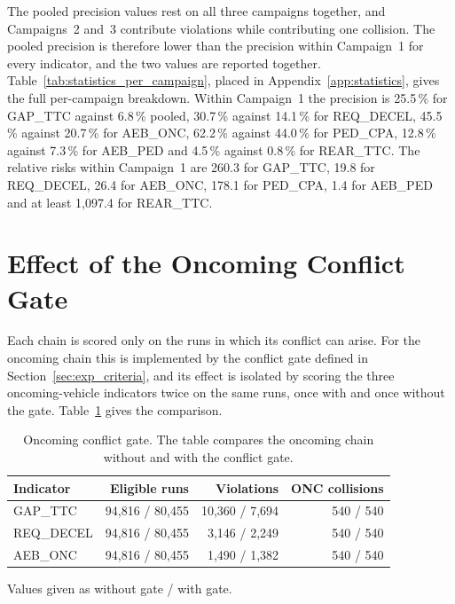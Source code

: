 The pooled precision values rest on all three campaigns together, and
Campaigns~2 and~3 contribute violations while contributing one collision. The
pooled precision is therefore lower than the precision within Campaign~1 for
every indicator, and the two values are reported together.
Table~\ref{tab:statistics_per_campaign}, placed in Appendix~\ref{app:statistics},
gives the full per-campaign breakdown. Within Campaign~1 the precision is
25.5\,\% for GAP\_TTC against 6.8\,\% pooled, 30.7\,\% against 14.1\,\% for
REQ\_DECEL, 45.5\,\% against 20.7\,\% for AEB\_ONC, 62.2\,\% against 44.0\,\%
for PED\_CPA, 12.8\,\% against 7.3\,\% for AEB\_PED and 4.5\,\% against 0.8\,\%
for REAR\_TTC. The relative risks within Campaign~1 are 260.3 for GAP\_TTC, 19.8
for REQ\_DECEL, 26.4 for AEB\_ONC, 178.1 for PED\_CPA, 1.4 for AEB\_PED and at
least 1,097.4 for REAR\_TTC.

\section{Effect of the Oncoming Conflict Gate}
\label{sec:results_gate}

Each chain is scored only on the runs in which its conflict can arise. For the
oncoming chain this is implemented by the conflict gate defined in
Section~\ref{sec:exp_criteria}, and its effect is isolated by scoring the
three oncoming-vehicle indicators twice on the same runs, once with and once
without the gate. Table~\ref{tab:conflict_gate} gives the comparison.

\begin{table}[htbp]
\centering
\caption[Oncoming conflict gate]{Oncoming conflict gate. The table compares the oncoming chain without and with the conflict gate.}
\label{tab:conflict_gate}
\small
\begin{tabular}{@{}lrrr@{}}
\toprule
{\bfseries Indicator} & {\bfseries Eligible runs} & {\bfseries Violations} & {\bfseries ONC collisions} \\
\midrule
GAP\_TTC & 94,816 / 80,455 & 10,360 / 7,694 & 540 / 540 \\
REQ\_DECEL & 94,816 / 80,455 & 3,146 / 2,249 & 540 / 540 \\
AEB\_ONC & 94,816 / 80,455 & 1,490 / 1,382 & 540 / 540 \\
\bottomrule
\end{tabular}
\par\smallskip\footnotesize\raggedright Values given as without gate / with gate.
\end{table}

